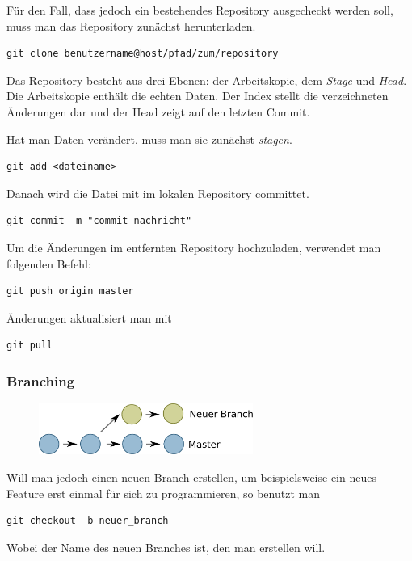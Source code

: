 Für den Fall, dass jedoch ein bestehendes Repository ausgecheckt werden soll, muss man das Repository zunächst herunterladen.
\begin{verbatim}
git clone benutzername@host/pfad/zum/repository
\end{verbatim}

Das Repository besteht aus drei Ebenen: der Arbeitskopie, dem \textit{Stage} und \textit{Head}.
Die Arbeitskopie enthält die echten Daten. Der Index stellt die verzeichneten Änderungen dar und der Head zeigt auf den letzten Commit.

Hat man Daten verändert, muss man sie zunächst \textit{stagen}.
\begin{verbatim}
git add <dateiname>
\end{verbatim}

Danach wird die Datei mit  im lokalen Repository committet.
\begin{verbatim}
git commit -m "commit-nachricht"
\end{verbatim}

Um die Änderungen im entfernten Repository hochzuladen, verwendet man folgenden Befehl: 
\begin{verbatim}
git push origin master
\end{verbatim}

Änderungen aktualisiert man mit 
\begin{verbatim}
git pull
\end{verbatim}

\subsubsection{Branching}

\begin{figure}[htb]
\begin{center}
\includegraphics[width=7cm]{bilder/branch.pdf}
\end{center} 
\end{figure}

Will man jedoch einen neuen Branch erstellen, um beispielsweise ein neues Feature erst einmal für sich zu programmieren, so benutzt man
\begin{verbatim}
git checkout -b neuer_branch
\end{verbatim}
Wobei  der Name des neuen Branches ist, den man erstellen will.

